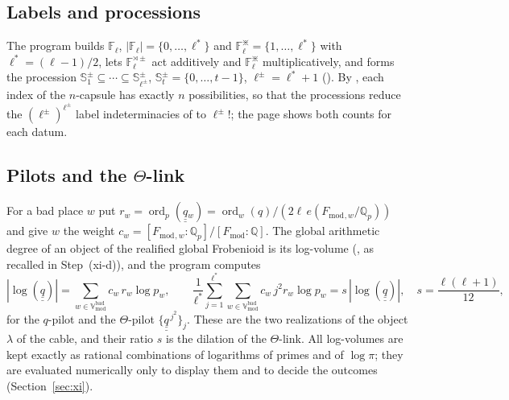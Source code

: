 \documentclass[11pt,a4paper]{article}
\newcommand{\qq}{\underline{\underline{q}}{}}
\newcommand{\F}{\mathbb{F}}
\newcommand{\Q}{\mathbb{Q}}
\newcommand{\ord}{\operatorname{ord}}
\newcommand{\Fmod}{F_{\mathrm{mod}}}
\newcommand{\Vbad}{\mathbb{V}^{\mathrm{bad}}_{\mathrm{mod}}}
\begin{document}
\subsection{Labels and processions}\label{sec:labels}
The program builds $\F_\ell$, $|\F_\ell|=\{0,\dots,\ell^*\}$ and $\F_\ell^{\divideontimes}=\{1,\dots,\ell^*\}$ with
$\ell^*=(\ell-1)/2$, lets $\F_\ell^{\rtimes\pm}$ act additively and $\F_\ell^{\divideontimes}$ multiplicatively, and
forms the procession $\mathbb{S}^\pm_1\subseteq\cdots\subseteq\mathbb{S}^\pm_{\ell^\pm}$,
$\mathbb{S}^\pm_t=\{0,\dots,t-1\}$, $\ell^\pm=\ell^*+1$ (\cite[Def.~4.10, Props.~4.11, 6.9]{IUT1}). By
\cite[Prop.~6.9(i)]{IUT1}, each index of the $n$-capsule has exactly $n$ possibilities, so that the processions
reduce the $(\ell^\pm)^{\ell^\pm}$ label indeterminacies of \cite[Prop.~6.8(ii)]{IUT1} to $\ell^\pm!$; the page
shows both counts for each datum.

\subsection{Pilots and the \texorpdfstring{$\Theta$}{Theta}-link}\label{sec:pilots}
For a bad place $w$ put $r_w=\ord_p(\qq_w)=\ord_w(q)/(2\ell\,e(\Fmod{}_{,w}/\Q_p))$ and give $w$ the weight
$c_w=[\Fmod{}_{,w}:\Q_p]/[\Fmod:\Q]$. The global arithmetic degree of an object of the realified global
Frobenioid is its log-volume (\cite[Prop.~3.9(iii)]{IUT3}, as recalled in Step~(xi-d)), and the program computes
\[
|\log(\qq)|=\sum_{w\in\Vbad}c_w\,r_w\log p_w,\qquad
\frac1{\ell^*}\sum_{j=1}^{\ell^*}\sum_{w\in\Vbad}c_w\,j^2r_w\log p_w=s\,|\log(\qq)|,\quad s=\frac{\ell(\ell+1)}{12},
\]
for the $q$-pilot and the $\Theta$-pilot $\{\qq^{\,j^2}\}_{j}$. These are the two realizations of the object
$\lambda$ of the cable, and their ratio $s$ is the dilation of the $\Theta$-link. All log-volumes are kept exactly
as rational combinations of logarithms of primes and of $\log\pi$; they are evaluated numerically only to display them
and to decide the outcomes (Section~\ref{sec:xi}).
\end{document}
